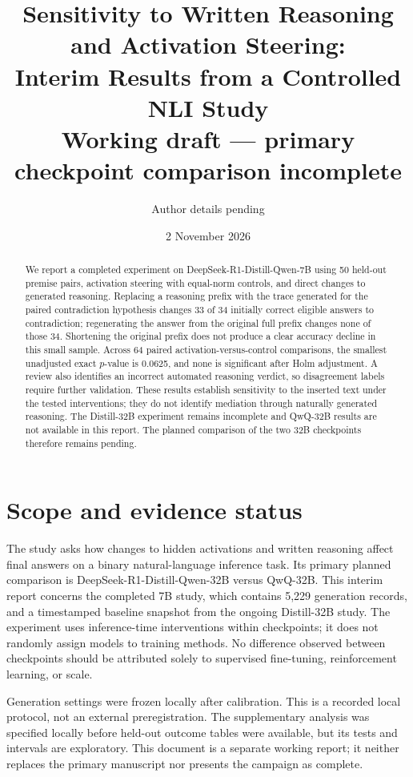 \documentclass[10pt]{article}
\title{Sensitivity to Written Reasoning and Activation Steering:\\
Interim Results from a Controlled NLI Study\\[0.5em]
\large Working draft --- primary checkpoint comparison incomplete}
\author{Author details pending}
\date{2 November 2026}
\begin{document}
\maketitle
\begin{abstract}
We report a completed experiment on DeepSeek-R1-Distill-Qwen-7B using 50
held-out premise pairs, activation steering with equal-norm controls, and direct
changes to generated reasoning. Replacing a reasoning prefix with the trace
generated for the paired contradiction hypothesis changes 33 of 34 initially
correct eligible answers to contradiction; regenerating the answer from the
original full prefix changes none of those 34. Shortening the original prefix
does not produce a clear accuracy decline in this small sample. Across 64 paired
activation-versus-control comparisons, the smallest unadjusted exact $p$-value
is 0.0625, and none is significant after Holm adjustment. A review also identifies
an incorrect automated reasoning verdict, so disagreement labels require further
validation. These results establish sensitivity to the inserted text under the
tested interventions; they do not identify mediation through naturally generated
reasoning. The Distill-32B experiment remains incomplete and QwQ-32B results are
not available in this report. The planned comparison of the two 32B checkpoints
therefore remains pending.
\end{abstract}

\section{Scope and evidence status}
The study asks how changes to hidden activations and written reasoning affect
final answers on a binary natural-language inference task. Its primary planned
comparison is DeepSeek-R1-Distill-Qwen-32B versus QwQ-32B. This interim report
concerns the completed 7B study, which contains 5,229 generation records, and a
timestamped baseline snapshot from the ongoing Distill-32B study. The experiment
uses inference-time interventions within checkpoints; it does not randomly assign
models to training methods. No difference observed between checkpoints should be
attributed solely to supervised fine-tuning, reinforcement learning, or scale.

Generation settings were frozen locally after calibration. This is a recorded
local protocol, not an external preregistration. The supplementary analysis was
specified locally before held-out outcome tables were available, but its tests
and intervals are exploratory. This document is a separate working report;
it neither replaces the primary manuscript nor presents the campaign as complete.
\end{document}
